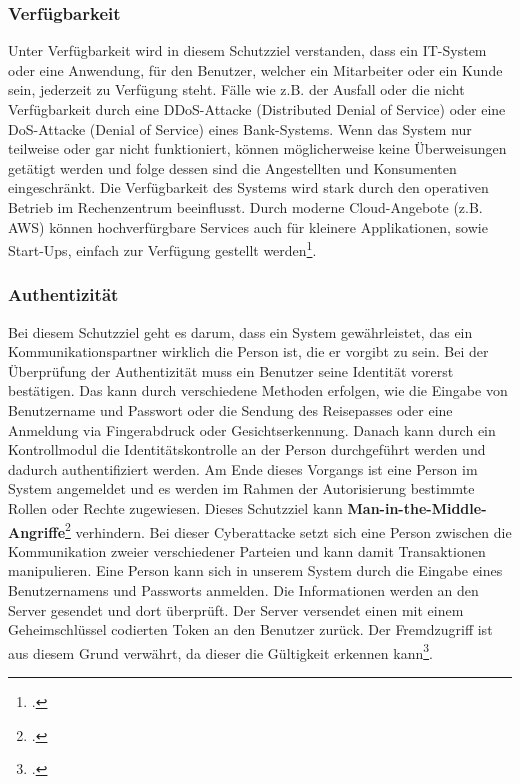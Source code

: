 \subsubsection{Verfügbarkeit}
Unter Verfügbarkeit wird in diesem Schutzziel verstanden, dass ein IT-System oder eine Anwendung, für den Benutzer, welcher ein Mitarbeiter oder ein Kunde sein, jederzeit zu Verfügung steht. Fälle wie z.B. der Ausfall oder die nicht Verfügbarkeit durch eine DDoS-Attacke (Distributed Denial of Service) oder eine DoS-Attacke (Denial of Service) eines Bank-Systems. Wenn das System nur teilweise oder gar nicht funktioniert, können möglicherweise keine Überweisungen getätigt werden und folge dessen sind die Angestellten und Konsumenten eingeschränkt. 
Die Verfügbarkeit des Systems wird stark durch den operativen Betrieb im Rechenzentrum beeinflusst. Durch moderne Cloud-Angebote (z.B. AWS) können hochverfürgbare Services auch für kleinere Applikationen, sowie Start-Ups, einfach zur Verfügung gestellt werden\footcite{Lehrunterlagen-HTL-cloud}.

\subsubsection{Authentizität}
Bei diesem Schutzziel geht es darum, dass ein System gewährleistet, das ein Kommunikationspartner wirklich die Person ist, die er vorgibt zu sein. Bei der Überprüfung der Authentizität muss ein Benutzer seine Identität vorerst bestätigen. Das kann durch verschiedene Methoden erfolgen, wie die Eingabe von Benutzername und Passwort oder die Sendung des Reisepasses oder eine Anmeldung via Fingerabdruck oder Gesichtserkennung. Danach kann durch ein Kontrollmodul die Identitätskontrolle an der Person durchgeführt werden und dadurch authentifiziert werden. Am Ende dieses Vorgangs ist eine Person im System angemeldet und es werden im Rahmen der Autorisierung bestimmte Rollen oder Rechte zugewiesen.
Dieses Schutzziel kann \textbf{Man-in-the-Middle-Angriffe}\footcite{man-in-middle} verhindern. Bei dieser Cyberattacke setzt sich eine Person zwischen die Kommunikation zweier verschiedener Parteien und kann damit Transaktionen manipulieren. 
Eine Person kann sich in unserem System durch die Eingabe eines Benutzernamens und Passworts anmelden. Die Informationen werden an den Server gesendet und dort überprüft. Der Server versendet einen mit einem Geheimschlüssel codierten Token an den Benutzer zurück. Der Fremdzugriff ist aus diesem Grund verwährt, da dieser die Gültigkeit erkennen kann\footcite{Lehrunterlagen-HTL-cloud}.

